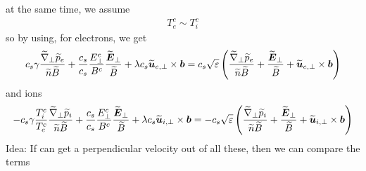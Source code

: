 %
at the same time, we assume
%
\begin{align*}
    T_e^c\sim T_i^c
\end{align*}
%
so by using, for electrons, we get
%
\begin{align*}
c_s
\gamma
\frac{ \widetilde{ \nabla}_\perp \widetilde{ p}_e }{\widetilde{ n} \widetilde{ B}}
+ \frac{c_s}{c_s}\frac{E_\perp^c}{B^c}
\frac{\widetilde{ \boldsymbol{E}}_\perp}{\widetilde{ B}}
+ \lambda c_s
\widetilde{ \boldsymbol{u}}_{e,\perp}\times\boldsymbol{b}
=
c_s
\sqrt{\varepsilon}
\left(
\frac{ \widetilde{ \nabla}_\perp \widetilde{ p}_e }{\widetilde{ n} \widetilde{ B}}
+
\frac{\widetilde{ \boldsymbol{E}}_\perp}{\widetilde{ B}}
+
\widetilde{ \boldsymbol{u}}_{e,\perp}\times\boldsymbol{b}
\right)
\end{align*}
%
and ions
%
\begin{align*}
    -
c_s
\gamma
\frac{T_i^c}{T_e^c}
\frac{ \widetilde{ \nabla}_\perp \widetilde{ p}_i }{\widetilde{ n} \widetilde{ B}}
+ \frac{c_s}{c_s}\frac{E_\perp^c}{B^c}
\frac{\widetilde{ \boldsymbol{E}}_\perp}{\widetilde{ B}}
+ \lambda c_s
\widetilde{ \boldsymbol{u}}_{i,\perp}\times\boldsymbol{b}
=
-
c_s
\sqrt{\varepsilon}
\left(
\frac{ \widetilde{ \nabla}_\perp \widetilde{ p}_i }{\widetilde{ n} \widetilde{ B}}
+
\frac{\widetilde{ \boldsymbol{E}}_\perp}{\widetilde{ B}}
+
\widetilde{ \boldsymbol{u}}_{i,\perp}\times\boldsymbol{b}
\right)
\end{align*}
%
Idea: If can get a perpendicular velocity out of all these, then we can compare
the terms

